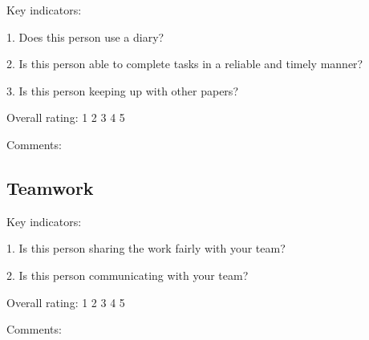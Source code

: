 \documentclass{article}   	%
\begin{document}
Key indicators: 

1.  Does this person use a diary?

2.  Is this person able to complete tasks in a reliable and timely manner?

3.  Is this person keeping up with other papers?

Overall rating: \hskip 1cm 1 \hskip 1cm 2 \hskip 1cm 3 \hskip 1cm 4 \hskip 1cm 5 

Comments:

\vskip 5cm

\subsection*{Teamwork}

Key indicators: 

1.  Is this person sharing the work fairly with your team?

2.  Is this person communicating with your team?


Overall rating: \hskip 1cm 1 \hskip 1cm 2 \hskip 1cm 3 \hskip 1cm 4 \hskip 1cm 5 

Comments:

\vskip 4cm
\end{document}
